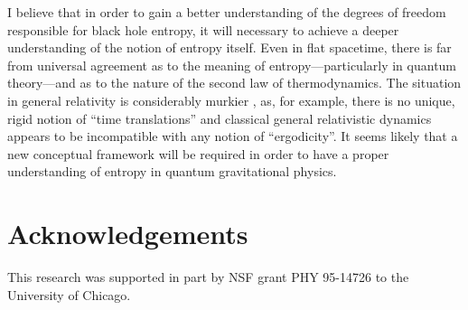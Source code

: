 I believe that in order to gain a better understanding of the degrees
of freedom responsible for black hole entropy, it will necessary to
achieve a deeper understanding of the notion of entropy itself. Even
in flat spacetime, there is far from universal agreement as to the
meaning of entropy---particularly in quantum theory---and as to the
nature of the second law of thermodynamics. The situation in general
relativity is considerably murkier \cite{w2}, as, for example, there
is no unique, rigid notion of ``time translations'' and classical
general relativistic dynamics appears to be incompatible with any
notion of ``ergodicity''.  It seems likely that a new conceptual
framework will be required in order to have a proper understanding of
entropy in quantum gravitational physics.


\section{Acknowledgements}
\label{acknowledgements}

This research was supported in part by NSF grant PHY 95-14726 to the
University of Chicago.


